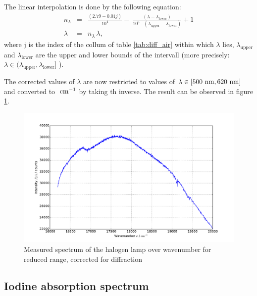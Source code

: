 The linear interpolation is done by the following equation:
\begin{eqnarray}
    n_\lambda &=& \frac{(2.79 - 0.01 j)}{10 ^{4}} - \
    \frac{(\lambda - \lambda_\mathrm{lower})} {10^{6} \cdot \
(\lambda_\mathrm{upper} - \lambda_\mathrm{lower})} + 1 \\
    \lambda &=& n_\lambda \, \lambda,
    \label{eqn:lin_interpol}
\end{eqnarray}
where j is the index of the collum of table \ref{tab:diff_air} within which $\lambda$ lies, 
$\lambda_\mathrm{upper}$ and $\lambda_\mathrm{lower}$ are the upper and lower bounds of the 
intervall (more precisely: $\lambda \in (\lambda_\mathrm{upper}, \lambda_\mathrm{lower}]$ ). 

The corrected values of $\lambda$ are now restricted to values of 
$\lambda \in [500\ \mathrm{nm}, 620\ \mathrm{nm}]$ and converted to $\ \mathrm{cm^{-1}}$ by taking th inverse. The result 
can be observed in figure \ref{fig:spectrum_halogen_red}.
\begin{figure}
\centering
\includegraphics[width=\pltw]{analysis/figures/halogen_red.pdf}
\caption{Measured spectrum of the halogen lamp over wavenumber for reduced range, 
corrected for diffraction}
\label{fig:spectrum_halogen_red}
\end{figure}

\FloatBarrier

\subsection{Iodine absorption spectrum}

